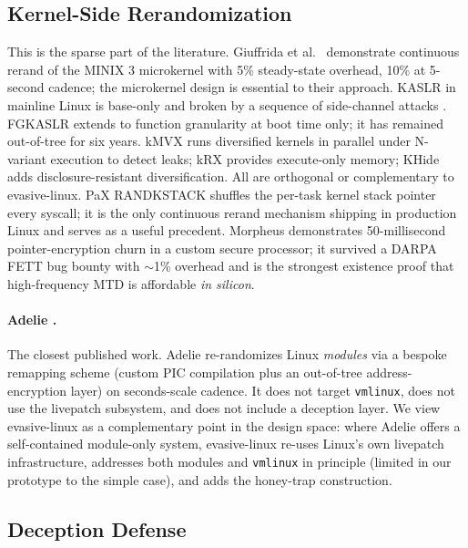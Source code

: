 \documentclass[10pt,letterpaper]{article}
\begin{document}
\subsection{Kernel-Side Rerandomization}

This is the sparse part of the literature. Giuffrida et al.\
\cite{giuffrida} demonstrate continuous rerand of the MINIX 3
microkernel with 5\% steady-state overhead, 10\% at 5-second cadence;
the microkernel design is essential to their approach. KASLR in
mainline Linux is base-only and broken by a sequence of side-channel
attacks \cite{hund_prefetch,gruss_prefetch,drk,entrybleed}. FGKASLR
\cite{fgkaslr} extends to function granularity at boot time only; it
has remained out-of-tree for six years. kMVX \cite{kmvx} runs
diversified kernels in parallel under N-variant execution to detect
leaks; kRX \cite{krx} provides execute-only memory; KHide \cite{khide}
adds disclosure-resistant diversification. All are orthogonal or
complementary to evasive-linux. PaX RANDKSTACK \cite{pax_randkstack}
shuffles the per-task kernel stack pointer every syscall; it is the
only continuous rerand mechanism shipping in production Linux and
serves as a useful precedent. Morpheus \cite{morpheus} demonstrates
50-millisecond pointer-encryption churn in a custom secure processor;
it survived a DARPA FETT bug bounty with $\sim$1\% overhead and is the
strongest existence proof that high-frequency MTD is affordable
\emph{in silicon}.

\paragraph{Adelie \cite{adelie}.} The closest published work. Adelie
re-randomizes Linux \emph{modules} via a bespoke remapping scheme
(custom PIC compilation plus an out-of-tree address-encryption layer)
on seconds-scale cadence. It does not target \texttt{vmlinux}, does
not use the livepatch subsystem, and does not include a deception
layer. We view evasive-linux as a complementary point in the design
space: where Adelie offers a self-contained module-only system,
evasive-linux re-uses Linux's own livepatch infrastructure, addresses
both modules and \texttt{vmlinux} in principle (limited in our
prototype to the simple case), and adds the honey-trap construction.

\subsection{Deception Defense}
\end{document}
